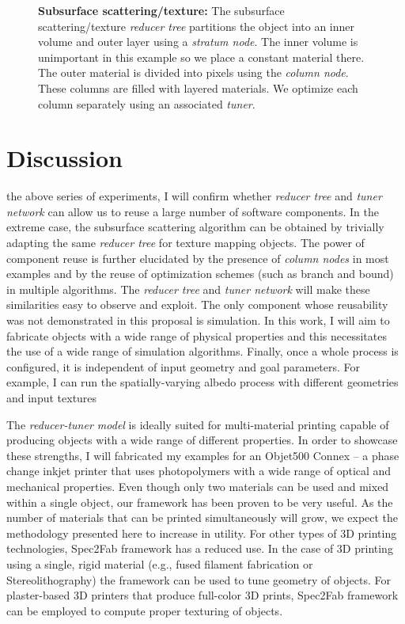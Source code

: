 \begin{figure}[t]
{\textbf{Subsurface scattering/texture:} The subsurface scattering/texture \emph{reducer tree} partitions the object into an inner volume and outer layer using a \emph{stratum node}. The inner volume is unimportant in this example so we place a constant material there. The outer material is divided into pixels using the \emph{column node}. These columns are filled with layered materials. We optimize each column separately using an associated \emph{tuner}. }
\label{fig:ReducerTreesAdditional}
\end{figure}


\chapter{Discussion}
 the above series of experiments, I will confirm whether \emph{reducer tree} and \emph{tuner network} can allow us to reuse a large number of software components.
In the extreme case, the subsurface scattering algorithm can be obtained by trivially adapting the same \emph{reducer tree} for texture mapping objects.
The power of component reuse is further elucidated by the presence of \emph{column nodes} in most examples and by the reuse of optimization schemes (such as branch and bound) in multiple algorithms.
The \emph{reducer tree} and \emph{tuner network} will make these similarities easy to observe and exploit.
The only component whose reusability was not demonstrated in this proposal is simulation.
In this work, I will aim to fabricate objects with a wide range of physical properties and this necessitates the use of a wide range of simulation algorithms. Finally, once a whole process is configured, it is independent of input geometry and goal parameters. For example, I can run the spatially-varying albedo process with different geometries and input textures

The \emph{reducer-tuner model} is ideally suited for multi-material printing capable of producing objects with a wide range of different properties.
In order to showcase these strengths, I will fabricated my examples for an Objet500 Connex -- a phase change inkjet printer that uses photopolymers with a wide range of optical and mechanical properties. Even though only two materials can be used and mixed within a single object, our framework has been proven to be very useful. 
As the number of materials that can be printed simultaneously will grow, we expect the methodology presented here to increase in utility.
For other types of 3D printing technologies, Spec2Fab framework has a reduced use. In the case of 3D printing using a single, rigid material (e.g., fused filament fabrication or Stereolithography) the framework can be used to tune geometry of objects. For plaster-based 3D printers that produce full-color 3D prints, Spec2Fab framework can be employed to compute proper texturing of objects.
